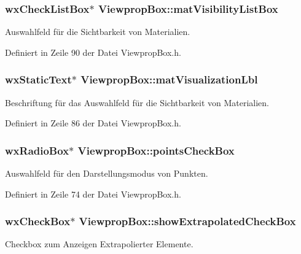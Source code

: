 \hypertarget{classViewpropBox_a8e6d0646ebdd844f96acde46e63fb74d}{
\subsubsection[{mat\-Visibility\-List\-Box}]{\setlength{\rightskip}{0pt plus 5cm}wx\-Check\-List\-Box$\ast$ Viewprop\-Box\-::mat\-Visibility\-List\-Box\hspace{0.3cm}{\ttfamily [private]}}}\label{classViewpropBox_a8e6d0646ebdd844f96acde46e63fb74d}
Auswahlfeld für die Sichtbarkeit von Materialien. 

Definiert in Zeile 90 der Datei Viewprop\-Box.\-h.

\hypertarget{classViewpropBox_a6352cdc6579ed2b9a7cfdd28a847bfec}{
\subsubsection[{mat\-Visualization\-Lbl}]{\setlength{\rightskip}{0pt plus 5cm}wx\-Static\-Text$\ast$ Viewprop\-Box\-::mat\-Visualization\-Lbl\hspace{0.3cm}{\ttfamily [private]}}}\label{classViewpropBox_a6352cdc6579ed2b9a7cfdd28a847bfec}
Beschriftung für das Auswahlfeld für die Sichtbarkeit von Materialien. 

Definiert in Zeile 86 der Datei Viewprop\-Box.\-h.

\hypertarget{classViewpropBox_a706dfcdceaa1afff899f51eb2ebded81}{
\subsubsection[{points\-Check\-Box}]{\setlength{\rightskip}{0pt plus 5cm}wx\-Radio\-Box$\ast$ Viewprop\-Box\-::points\-Check\-Box\hspace{0.3cm}{\ttfamily [private]}}}\label{classViewpropBox_a706dfcdceaa1afff899f51eb2ebded81}
Auswahlfeld für den Darstellungsmodus von Punkten. 

Definiert in Zeile 74 der Datei Viewprop\-Box.\-h.

\hypertarget{classViewpropBox_a26459f6ab8498b578ecf30dcb4fd582e}{
\subsubsection[{show\-Extrapolated\-Check\-Box}]{\setlength{\rightskip}{0pt plus 5cm}wx\-Check\-Box$\ast$ Viewprop\-Box\-::show\-Extrapolated\-Check\-Box\hspace{0.3cm}{\ttfamily [private]}}}\label{classViewpropBox_a26459f6ab8498b578ecf30dcb4fd582e}
Checkbox zum Anzeigen Extrapolierter Elemente. 

